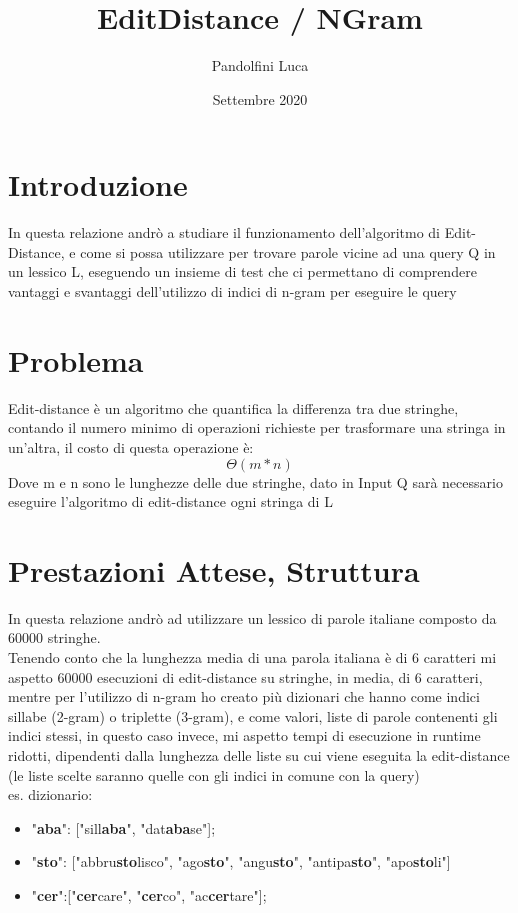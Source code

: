 \documentclass{article}
\title{EditDistance / NGram}
\author{Pandolfini Luca}
\date{Settembre 2020}
\begin{document}
\maketitle

\section{Introduzione}
In questa relazione andrò a studiare il funzionamento dell'algoritmo di Edit-Distance, e come si possa utilizzare per trovare parole vicine ad una query Q in un lessico L, eseguendo un insieme di test che ci permettano di comprendere vantaggi e svantaggi dell’utilizzo di indici di n-gram per eseguire le query

\section{Problema}
Edit-distance è un algoritmo che quantifica la differenza tra due stringhe, contando il numero minimo di operazioni richieste per trasformare una stringa in un'altra,
il costo di questa operazione è:
\begin{equation}
    \Theta(m * n)
\end{equation}
Dove m e n sono le lunghezze delle due stringhe, dato in Input Q sarà necessario eseguire l'algoritmo di edit-distance ogni stringa di L

\section{Prestazioni Attese, Struttura}
In questa relazione andrò ad utilizzare un lessico di parole italiane composto da 60000 stringhe.\\ Tenendo conto che la lunghezza media di una parola italiana è di 6 caratteri mi aspetto 60000 esecuzioni di edit-distance su stringhe, in media, di 6 caratteri, mentre per l'utilizzo di n-gram ho creato più dizionari che hanno come indici sillabe (2-gram) o triplette (3-gram), e come valori, liste di parole contenenti gli indici stessi, in questo caso invece, mi aspetto tempi di esecuzione in runtime ridotti, dipendenti dalla lunghezza delle liste su cui viene eseguita la edit-distance (le liste scelte saranno quelle con gli indici in comune con la query)\\
es. dizionario:
\begin{itemize}
\item "\textbf{aba}": ["sill\textbf{aba}", "dat\textbf{aba}se"];
\item "\textbf{sto}": ["abbru\textbf{sto}lisco", "ago\textbf{sto}", "angu\textbf{sto}", "antipa\textbf{sto}", "apo\textbf{sto}li"]
\item "\textbf{cer}":["\textbf{cer}care", "\textbf{cer}co", "ac\textbf{cer}tare"];
\end{itemize}
\end{document}
